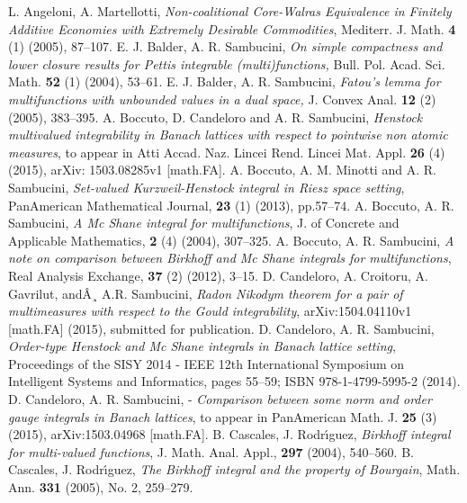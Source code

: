 \documentclass[11pt,a4paper,twoside]{amsart}
\begin{document}
\small
\begin{thebibliography}{99}
 L. Angeloni, A. Martellotti,  {\em Non-coalitional Core-Walras Equivalence in Finitely Additive Economies with Extremely Desirable Commodities},
 Mediterr. J.  Math. {\bf 4} (1) (2005), 87--107.  
 E. J. Balder,  A. R. Sambucini,  {\em On simple compactness and lower closure results for Pettis integrable {\rm(}multi{\rm)}functions,} Bull. Pol. Acad. Sci. Math. \textbf{52} (1) (2004), 53--61.
 E. J. Balder,  A. R. Sambucini,  {\em  Fatou's lemma for multifunctions with unbounded values in a dual space,} J. Convex Anal. \textbf{12} (2) (2005), 383--395.
  A. Boccuto, D. Candeloro and A. R. Sambucini,   \textit{Henstock multivalued integrability in Banach lattices with respect to pointwise non atomic measures}, to appear in 
Atti Accad. Naz. Lincei Rend. Lincei Mat. Appl. {\bf 26} (4)  (2015), arXiv: 1503.08285v1  [math.FA].
 A.  Boccuto, A. M. Minotti and  A. R. Sambucini,  \textit{Set-valued Kurzweil-Henstock integral in Riesz space setting}, 
PanAmerican Mathematical Journal, {\bf 23} (1) (2013), pp.57--74. 
   A. Boccuto, A. R. Sambucini,    \textit{ A Mc Shane integral for multifunctions}, J. of Concrete and Applicable Mathematics, {\bf 2} (4)    (2004), 307--325. 
 A. Boccuto,  A. R. Sambucini,  \textit{A note on comparison between Birkhoff and Mc Shane integrals for multifunctions}, Real Analysis Exchange,  {\bf 37} (2) (2012), 3--15.
 D. Candeloro, A. Croitoru, A. Gavrilut, andÂ¸ A.R. Sambucini,  \textit{Radon Nikodym theorem for a pair of multimeasures with respect to the Gould integrability}, arXiv:1504.04110v1 [math.FA] (2015), submitted for publication.
 D. Candeloro, A. R. Sambucini,   \textit{Order-type Henstock and Mc Shane integrals in Banach lattice setting},  Proceedings of the  SISY 2014 - IEEE 12th International Symposium on Intelligent Systems and Informatics, pages 55--59; ISBN 978-1-4799-5995-2 (2014).
 D. Candeloro, A. R. Sambucini, -  \textit{Comparison between some norm and order gauge integrals in Banach lattices}, to appear in PanAmerican Math. J. {\bf 25}
(3)    (2015), arXiv:1503.04968 [math.FA].
 B. Cascales, J. Rodr\'{\i}guez,   \textit{Birkhoff integral for multi-valued functions}, J. Math. Anal. Appl., {\bf 297} (2004), 540--560.
 B. Cascales, J. Rodr\'{\i}guez,   \textit{The Birkhoff integral and the property of Bourgain}, Math. Ann. {\bf 331} (2005), No. 2, 259--279.

\end{thebibliography}
\end{document}
